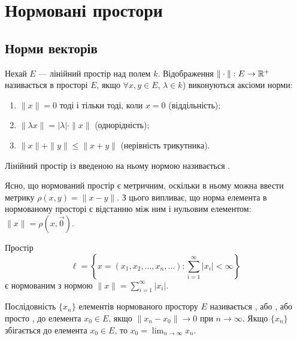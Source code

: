 \chapter{Нормовані простори}

\section{Норми векторів}

\begin{definition}
Нехай $E$ --- лінійний простір над полем $k$.
Відображення $\|\cdot\|: E \to \mathbb{R}^+$ називається  в просторі
$E$, якщо $\forall x, y \in E$, $\lambda \in k$) виконуються аксіоми норми:
\begin{enumerate}
\item $\|x\| = 0$ тоді і тільки тоді, коли $x = 0$ (віддільність);
\item $\|\lambda x\| = |\lambda| \cdot \|x\|$ (однорідність);
\item $\|x\| + \|y\| \le \|x + y\|$ (нерівність трикутника).
\end{enumerate}
\end{definition}

\begin{definition}
Лінійний простір із введеною на ньому нормою
називається .
\end{definition}

\begin{remark}
Ясно, що нормований простір є метричним, оскільки в
ньому можна ввести метрику $\rho(x, y) = \|x - y\|$. З цього
випливає, що норма елемента в нормованому просторі є
відстанню між ним і нульовим елементом: $\|x\| = \rho(x, \vec 0)$.
\end{remark}

\begin{example}
Простір
\begin{equation*}
    \ell = \left\{ x = (x_1, x_2, \dots, x_n, \dots): \sum_{i = 1}^\infty |x_i| < \infty \right\}
\end{equation*}
є нормованим з нормою $\|x\| = \sum_{i = 1}^\infty |x_i|$.
\end{example}

\begin{definition}
Послідовність $\{x_n\}$ елементів нормованого
простору $E$ називається , або , або просто , до елемента $x_0 \in E$, якщо
$\|x_n - x_0\| \to 0$ при $n \to \infty$.
Якщо $\{x_n\}$ збігається до елемента $x_0 \in E$, то
$x_0 = \lim_{n \to \infty} x_n$.
\end{definition}

